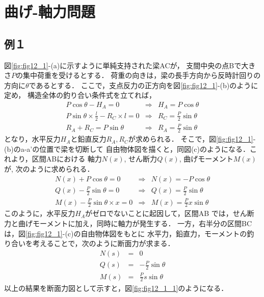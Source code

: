 \documentclass[10pt,a4j]{jarticle}
\begin{document}
\section{曲げ-軸力問題}
\subsection{例１}
図\ref{fig:fig12_1}-(a)に示すように単純支持された梁ACが，
支間中央の点Bで大きさ$P$の集中荷重を受けるとする．
荷重の向きは，梁の長手方向から反時計回りの方向に$\theta$であるとする．
ここで，支点反力の正方向を図\ref{fig:fig12_1}-(b)のように定め，
構造全体の釣り合い条件式を立てれば，
\begin{eqnarray}
	P\cos\theta-H_A=0 & \Rightarrow & H_A=P\cos\theta \\
	P\sin\theta \times \frac{l}{2}-R_C\times l =0 & \Rightarrow & R_C=\frac{P}{2}\sin\theta \\
	R_A+R_C=P\sin\theta & \Rightarrow & R_A=\frac{P}{2}\sin\theta
\end{eqnarray}
となり，水平反力$H_A$と鉛直反力$R_A,R_C$が求められる．
そこで，図\ref{fig:fig12_1}-(b)のa-a'の位置で梁を切断して
自由物体図を描くと，同図(c)のようになる．これより，区間ABにおける
軸力$N(x)$, せん断力$Q(x)$, 曲げモーメント$M(x)$が, 次のように求められる．
\begin{eqnarray}
	N(x)+P\cos\theta=0 & \Rightarrow & N(x)=-P\cos\theta \\
	Q(x)-\frac{P}{2}\sin\theta=0 & \Rightarrow & Q(x)=\frac{P}{2}\sin\theta \\
	M(x)-\frac{P}{2}\sin\theta\times x =0 & \Rightarrow & M(x)=\frac{P}{2}x\sin\theta
\end{eqnarray}
このように，水平反力$H_A$がゼロでないことに起因して，区間AB
では，せん断力と曲げモーメントに加え，同時に軸力が発生する．
一方，右半分の区間BCは，図\ref{fig:fig12_1}-(c)の自由物体図をもとに
水平力，鉛直力，モーメントの釣り合いを考えることで，次のように断面力が求まる．
\begin{eqnarray}
	N(s)&=& 0 \\
	Q(s)&=&-\frac{P}{2}\sin\theta \\
	M(s)&=&\frac{P}{2}s \sin\theta
\end{eqnarray}
以上の結果を断面力図として示すと，図\ref{fig:fig12_1_1}のようになる．
\end{document}
